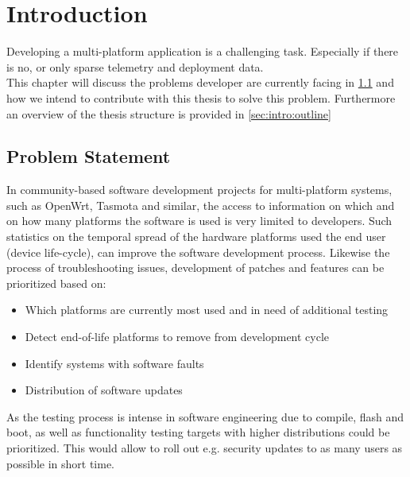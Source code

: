 \chapter{Introduction}
\label{chap:introduction}
%
Developing a multi-platform application is a challenging task. Especially if 
there is no, or only sparse telemetry and deployment data.\\
This chapter will discuss the problems developer are currently facing in \ref{sec:intro:probstatement} and how
we intend to contribute with this thesis to solve this problem. Furthermore an 
overview of the thesis structure is provided in \ref{sec:intro:outline}




\section{Problem Statement}
\label{sec:intro:probstatement}
%
In community-based software development projects for multi-platform systems, such as
OpenWrt, Tasmota and similar, the access to information on which and on how many platforms
the software is used is very limited to developers.
Such statistics on the temporal spread of the hardware platforms used
the end user (device life-cycle), can improve the software development process.
Likewise the process of troubleshooting issues, development of patches and features can be prioritized based on:
\begin{itemize}
    \item Which platforms are currently most used and in need of additional testing
    \item Detect end-of-life platforms to remove from development cycle
    \item Identify systems with software faults
    \item Distribution of software updates
\end{itemize}

As the testing process is intense in software engineering due to compile, flash and boot, as well as functionality testing targets with higher distributions could be prioritized.
This would allow to roll out e.g. security updates to as many users as possible in short time.\\

